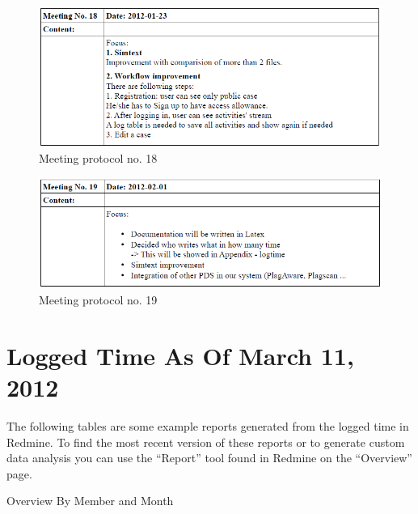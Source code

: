 \begin{appendix}
\begin{figure}
  \centering
    \includegraphics[width=\textwidth]{images/a_meetings/meeting_18.png}
  \caption{Meeting protocol no. 18}
  \label{fig:meeting protocol no. 18}
\end{figure}

\begin{figure}
  \centering
    \includegraphics[width=\textwidth]{images/a_meetings/meeting_19.png}
  \caption{Meeting protocol no. 19}
  \label{fig:meeting protocol no. 19}
\end{figure}



\chapter{Logged Time As Of March 11, 2012}

The following tables are some example reports generated from the logged time in Redmine. To find the most recent version
of these reports or to generate custom data analysis you can use the \enquote{Report} tool found in Redmine on the \enquote{Overview}
page.


\begin{table}[!h]
  \caption{Overview By Member and Month}
  \centering
\end{table}


\end{appendix}
